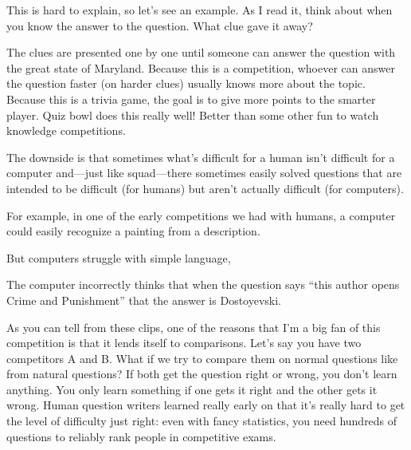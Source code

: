 This is hard to explain, so let’s see an example.  As I read it, think
about when you know the answer to the question.  What clue gave it
away?




The clues are presented one by one until someone can answer the
question with the great state of Maryland. Because this is a
competition, whoever can answer the question faster (on harder clues)
usually knows more about the topic.  Because this is a trivia game,
the goal is to give more points to the smarter player.  Quiz bowl does
this really well!  Better than some other fun to watch knowledge
competitions.

The downside is that sometimes what's difficult for a human isn't
difficult for a computer and—just like squad—there sometimes easily
solved questions that are intended to be difficult (for humans) but
aren't actually difficult (for computers).

For example, in one of the early competitions we had with humans, a
computer could easily recognize a painting from a description.

But computers struggle with simple language, 

The computer incorrectly thinks that when the question says “this author opens Crime and Punishment” that the answer is Dostoyevski.

As you can tell from these clips, one of the reasons that I’m a big fan of this competition is that it lends itself to comparisons. Let’s say you have two competitors A and B. What if we try to compare them on normal questions like from natural questions? If both get the question right or wrong, you don’t learn anything. You only learn something if one gets it right and the other gets it wrong. Human question writers learned really early on that it’s really hard to get the level of difficulty just right: even with fancy statistics, you need hundreds of questions to reliably rank people in competitive exams.

